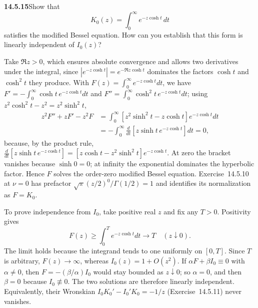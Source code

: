 \par\bigskip
\noindent\textbf{14.5.15}\quad Show that
\[
K_{0}(z)=\int_{0}^{\infty}e^{-z\cosh t}\,dt
\]
satisfies the modified Bessel equation. How can you establish that
this form is linearly independent of $I_{0}(z)$?
\par{}
\solution
Take $\Re z>0$, which ensures absolute convergence and allows
two derivatives under the integral, since
$|e^{-z\cosh t}|=e^{-\Re z\cosh t}$ dominates the factors $\cosh t$
and $\cosh^2t$ they produce. With
$F(z)=\int_0^\infty e^{-z\cosh t}dt$, we have
$F'=-\int_0^\infty\cosh t\,e^{-z\cosh t}dt$ and
$F''=\int_0^\infty\cosh^2t\,e^{-z\cosh t}dt$; using
$z^2\cosh^2t-z^2=z^2\sinh^2t$,
\begin{align*}
z^2F''+zF'-z^2F
&=\int_0^\infty[z^2\sinh^2t-z\cosh t]e^{-z\cosh t}dt\\
&=-\int_0^\infty\frac d{dt}
[z\sinh t\,e^{-z\cosh t}]dt=0,
\end{align*}
because, by the product rule,
$\frac d{dt}[z\sinh t\,e^{-z\cosh t}]
=[z\cosh t-z^2\sinh^2t]e^{-z\cosh t}$.
At zero the bracket vanishes because $\sinh0=0$; at infinity
the exponential dominates the hyperbolic factor. Hence $F$ solves
the order-zero modified Bessel equation. Exercise~14.5.10 at
$\nu=0$ has prefactor $\sqrt\pi(z/2)^0/\Gamma(1/2)=1$ and
identifies its normalization as $F=K_0$.

To prove independence from $I_0$, take positive real $z$ and fix
any $T>0$. Positivity gives
\[
F(z)\ge\int_0^T e^{-z\cosh t}dt\longrightarrow T
\quad(z\downarrow0).
\]
The limit holds because the integrand tends to one uniformly on
$[0,T]$. Since $T$ is arbitrary, $F(z)\to\infty$, whereas
$I_0(z)=1+O(z^2)$. If $\alpha F+\beta I_0\equiv0$ with $\alpha\ne0$,
then $F=-(\beta/\alpha)I_0$ would stay bounded as $z\downarrow0$;
so $\alpha=0$, and then $\beta=0$ because $I_0\not\equiv0$. The two
solutions are therefore linearly independent. Equivalently, their
Wronskian $I_0K_0'-I_0'K_0=-1/z$ (Exercise~14.5.11) never
vanishes.

